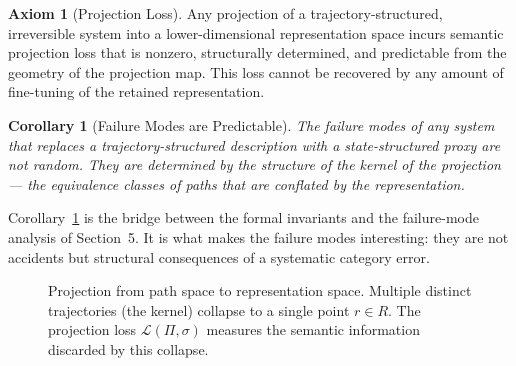 \documentclass[12pt, twoside]{article}
\theoremstyle{plain}
\newtheorem{corollary}[theorem]{Corollary}
\theoremstyle{definition}
\newtheorem{axiom}[theorem]{Axiom}
\theoremstyle{remark}
\newcommand{\Proj}{\Pi}
\begin{document}
\begin{axiom}[Projection Loss]
\label{ax:proj}
Any projection of a trajectory-structured, irreversible system
into a lower-dimensional representation space incurs semantic projection
loss that is nonzero, structurally determined, and predictable
from the geometry of the projection map.
This loss cannot be recovered by any amount of fine-tuning
of the retained representation.
\end{axiom}

\begin{corollary}[Failure Modes are Predictable]
\label{cor:failure}
The failure modes of any system that replaces a trajectory-structured
description with a state-structured proxy are not random.
They are determined by the structure of the kernel of the projection —
the equivalence classes of paths that are conflated by the representation.
\end{corollary}

Corollary~\ref{cor:failure} is the bridge between the formal invariants
and the failure-mode analysis of Section~5.
It is what makes the failure modes interesting: they are not accidents
but structural consequences of a systematic category error.

\begin{figure}[h]
\centering
{}
\caption{Projection from path space to representation space.
  Multiple distinct trajectories (the kernel) collapse to a single point $r \in R$.
  The projection loss $\mathcal{L}(\Proj, \sigma)$ measures the semantic
  information discarded by this collapse.}
\label{fig:projection}
\end{figure}
\end{document}
